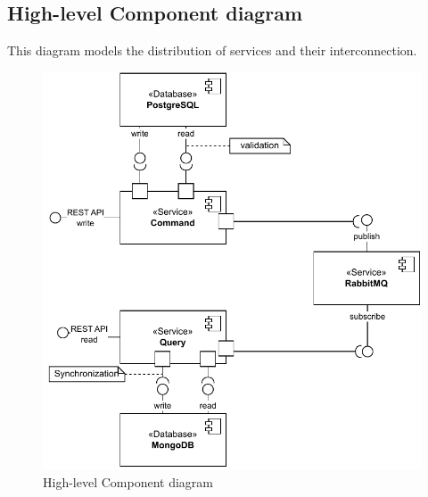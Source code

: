 \documentclass[12pt,english]{article}
\begin{document}
\subsection{High-level Component diagram}
This diagram models the distribution of services and their interconnection.
\begin{figure}[hp]
    \centering
    \includegraphics[scale=1.1]{images/componentDiagram.pdf}
    \caption{High-level Component diagram}
    \label{fig:my_label}
\end{figure}
\newpage
\end{document}
